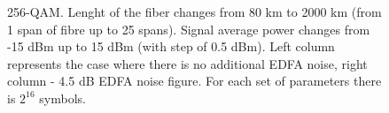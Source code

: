 \begin{figure}[htpb]
    \begin{minipage}[h]{0.48\linewidth}
    \end{minipage}
    \hfill
    \begin{minipage}[h]{0.48\linewidth}
    \end{minipage}
    \caption{256-QAM. Lenght of the fiber changes from 80 km to 2000 km (from 1 span of fibre up to 25 spans). Signal average power changes from -15 dBm up to 15 dBm (with step of 0.5 dBm). Left column represents the case where there is no additional EDFA noise, right column - 4.5 dB EDFA noise figure. For each set of parameters there is $2^{16}$ symbols.}
    \label{fig:hpcom_example2}
\end{figure}



